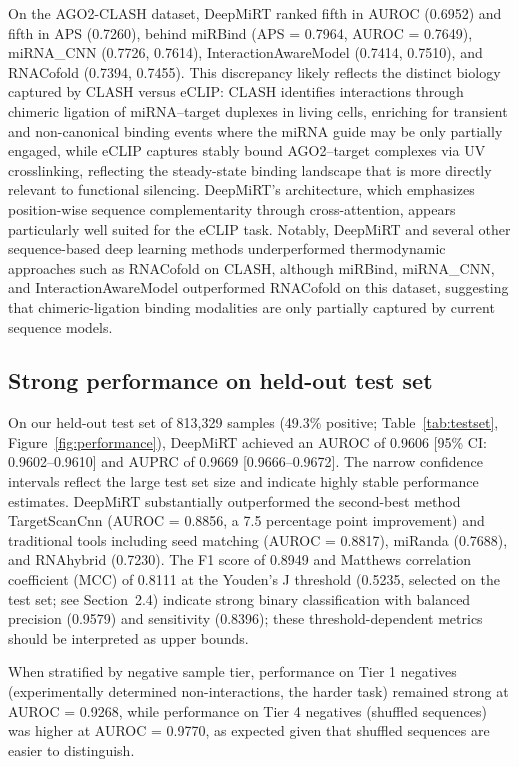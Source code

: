 \documentclass[10pt,a4paper]{article}
\begin{document}
On the AGO2-CLASH dataset, DeepMiRT ranked fifth in AUROC (0.6952) and fifth in APS (0.7260), behind miRBind (APS = 0.7964, AUROC = 0.7649), miRNA\_CNN (0.7726, 0.7614), InteractionAwareModel (0.7414, 0.7510), and RNACofold (0.7394, 0.7455). This discrepancy likely reflects the distinct biology captured by CLASH versus eCLIP: CLASH identifies interactions through chimeric ligation of miRNA--target duplexes in living cells, enriching for transient and non-canonical binding events where the miRNA guide may be only partially engaged, while eCLIP captures stably bound AGO2--target complexes via UV crosslinking, reflecting the steady-state binding landscape that is more directly relevant to functional silencing. DeepMiRT's architecture, which emphasizes position-wise sequence complementarity through cross-attention, appears particularly well suited for the eCLIP task. Notably, DeepMiRT and several other sequence-based deep learning methods underperformed thermodynamic approaches such as RNACofold on CLASH, although miRBind, miRNA\_CNN, and InteractionAwareModel outperformed RNACofold on this dataset, suggesting that chimeric-ligation binding modalities are only partially captured by current sequence models.

\subsection{Strong performance on held-out test set}

On our held-out test set of 813{,}329 samples (49.3\% positive; Table~\ref{tab:testset}, Figure~\ref{fig:performance}), DeepMiRT achieved an AUROC of 0.9606 [95\% CI: 0.9602--0.9610] and AUPRC of 0.9669 [0.9666--0.9672]. The narrow confidence intervals reflect the large test set size and indicate highly stable performance estimates. DeepMiRT substantially outperformed the second-best method TargetScanCnn (AUROC = 0.8856, a 7.5 percentage point improvement) and traditional tools including seed matching (AUROC = 0.8817), miRanda (0.7688), and RNAhybrid (0.7230). The F1 score of 0.8949 and Matthews correlation coefficient (MCC) of 0.8111 at the Youden's J threshold (0.5235, selected on the test set; see Section~2.4) indicate strong binary classification with balanced precision (0.9579) and sensitivity (0.8396); these threshold-dependent metrics should be interpreted as upper bounds.

When stratified by negative sample tier, performance on Tier 1 negatives (experimentally determined non-interactions, the harder task) remained strong at AUROC = 0.9268, while performance on Tier 4 negatives (shuffled sequences) was higher at AUROC = 0.9770, as expected given that shuffled sequences are easier to distinguish.
\end{document}
